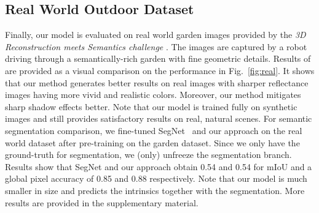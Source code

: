 \documentclass[runningheads]{llncs}
\begin{document}
\begin{table}[]
\centering
\caption{Influence of the weighting of the loss functions. SMSE loss is weighted by ($SMSE\times100\times w$). $w = 2$ appears to be the proper setting for both tasks} 
\label{Table:weights}
\end{table}

\subsection{Real World Outdoor Dataset}
Finally, our model is evaluated on real world garden images provided by the {\em 3D Reconstruction meets Semantics challenge} \cite{rms_challange}. The images are captured by a robot driving through a semantically-rich garden with fine geometric details. Results of \cite{shi} are provided as a visual comparison on the performance in Fig.~\ref{fig:real}. It shows that our method generates better results on real images with sharper reflectance images having more vivid and realistic colors. Moreover, our method mitigates sharp shadow effects better. Note that our model is trained fully on synthetic images and still provides satisfactory results on real, natural scenes. For semantic segmentation comparison, we fine-tuned SegNet~\cite{segnet} and our approach on the real world dataset after pre-training on the garden dataset. Since we only have the ground-truth for segmentation, we (only) unfreeze the segmentation branch. Results show that SegNet and our approach obtain 0.54 and 0.54 for mIoU and a global pixel accuracy of 0.85 and 0.88 respectively. Note that our model is much smaller in size and predicts the intrinsics together with the segmentation. More results are provided in the supplementary material.
\end{document}
